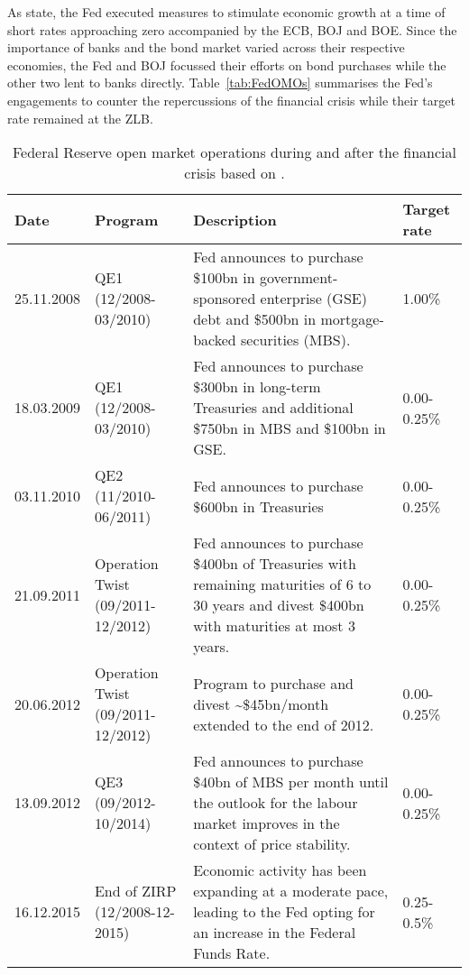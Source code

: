As \textcite{Fawley.2013} state, the Fed executed measures to stimulate economic growth at a time of short rates approaching zero accompanied by the ECB, BOJ and BOE. Since the importance of banks and the bond market varied across their respective economies, the Fed and BOJ focussed their efforts on bond purchases while the other two lent to banks directly. Table~\vref{tab:FedOMOs} summarises the Fed's engagements to counter the repercussions of the financial crisis while their target rate remained at the ZLB. 
%
%
\begin{sidewaystable}[htbp]
	\small
	\caption[Important announcements by the Federal Reserve Bank]{Federal Reserve open market operations during and after the financial crisis based on \textcite[p.~61]{Fawley.2013}.}
	\label{tab:FedOMOs}
	\centering
	\begin{tabular}{ll p{8cm}l}
		\toprule
		Date & Program & Description & Target rate  \\
		\midrule
		25.11.2008 & QE1 (12/2008-03/2010) & Fed announces to purchase \$100bn in government-sponsored enterprise (GSE) debt and \$500bn
			in mortgage-backed securities (MBS). & 1.00\% \\
		18.03.2009 & QE1 (12/2008-03/2010) & Fed announces to purchase \$300bn in long-term Treasuries and additional \$750bn in MBS and \$100bn in GSE. & 0.00-0.25\% \\
		03.11.2010 & QE2 (11/2010-06/2011) & Fed announces to purchase \$600bn in Treasuries &  0.00-0.25\% \\
		21.09.2011 & Operation Twist (09/2011-12/2012) & Fed announces to purchase \$400bn of Treasuries with remaining maturities of 6 to 30 years and divest \$400bn with maturities at most 3 years. & 0.00-0.25\% \\
		20.06.2012 & Operation Twist (09/2011-12/2012) & Program to purchase and divest \textasciitilde\$45bn/month extended to the end of 2012. & 0.00-0.25\% \\
 		13.09.2012 & QE3 (09/2012-10/2014)& Fed announces to purchase \$40bn of MBS per month until the outlook for the labour market improves in the context of price stability. & 0.00-0.25\% \\
 		16.12.2015 & End of ZIRP (12/2008-12-2015) & Economic activity has been expanding at a moderate pace, leading to the Fed opting for an increase in the Federal Funds Rate. & 0.25-0.5\% \\
		\bottomrule
	\end{tabular}
\end{sidewaystable}
%


